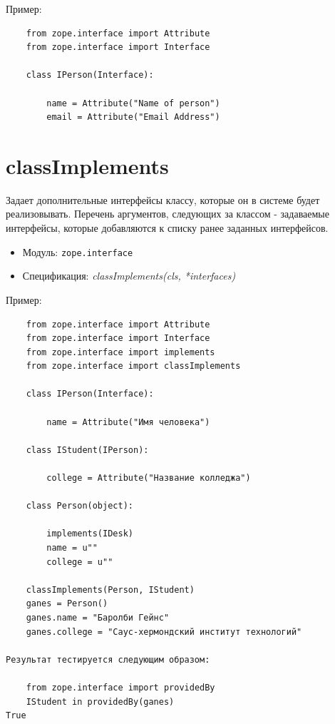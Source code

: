 \documentclass[a4paper,openany,twoside,draft]{book}
\providecommand*{\DUroletitlereference}[1]{\textsl{#1}}
\begin{document}
Пример:

\begin{verbatim}
    from zope.interface import Attribute
    from zope.interface import Interface

    class IPerson(Interface):

        name = Attribute("Name of person")
        email = Attribute("Email Address")
\end{verbatim}


\section*{classImplements%
  \label{classimplements}%
}

Задает дополнительные интерфейсы классу, которые он в системе будет реализовывать.  Перечень аргументов, следующих за классом - задаваемые интерфейсы, которые добавляются к списку ранее заданных интерфейсов.

\begin{itemize}

\item Модуль: \texttt{zope.interface}

\item Спецификация: \DUroletitlereference{classImplements(cls, *interfaces)}

\end{itemize}

Пример:

\begin{verbatim}
    from zope.interface import Attribute
    from zope.interface import Interface
    from zope.interface import implements
    from zope.interface import classImplements

    class IPerson(Interface):

        name = Attribute("Имя человека")

    class IStudent(IPerson):

        college = Attribute("Название колледжа")

    class Person(object):

        implements(IDesk)
        name = u""
        college = u""

    classImplements(Person, IStudent)
    ganes = Person()
    ganes.name = "Баролби Гейнс"
    ganes.college = "Саус-хермондский институт технологий"

Результат тестируется следующим образом:

    from zope.interface import providedBy
    IStudent in providedBy(ganes)
True
\end{verbatim}
\end{document}
